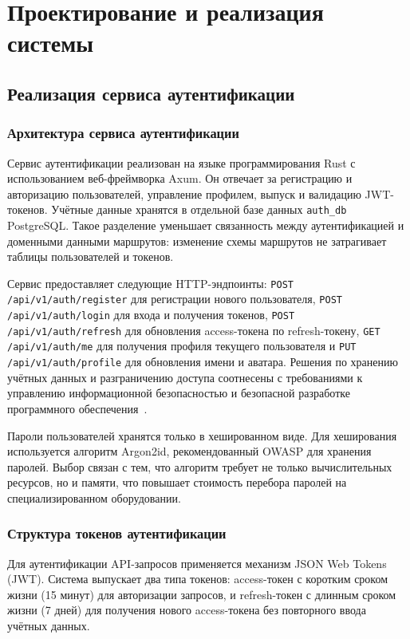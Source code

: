 \chapter{Проектирование и реализация системы}



\section{Реализация сервиса аутентификации}
\label{sec:auth-implementation}

\subsection{Архитектура сервиса аутентификации}

Сервис аутентификации реализован на языке программирования Rust с
использованием веб-фреймворка Axum. Он отвечает за регистрацию и авторизацию
пользователей, управление профилем, выпуск и валидацию JWT-токенов. Учётные
данные хранятся в отдельной базе данных \texttt{auth\_db} PostgreSQL. Такое
разделение уменьшает связанность между аутентификацией и доменными данными
маршрутов: изменение схемы маршрутов не затрагивает таблицы пользователей и
токенов.

Сервис предоставляет следующие HTTP-эндпоинты: \texttt{POST /api/v1/auth/register} для регистрации нового пользователя, \texttt{POST /api/v1/auth/login} для входа и получения токенов, \texttt{POST /api/v1/auth/refresh} для обновления access-токена по refresh-токену, \texttt{GET /api/v1/auth/me} для получения профиля текущего пользователя и \texttt{PUT /api/v1/auth/profile} для обновления имени и аватара. Решения по хранению учётных данных и разграничению доступа соотнесены с требованиями к управлению информационной безопасностью и безопасной разработке программного обеспечения~\cite{gost27001,gost56939}.

Пароли пользователей хранятся только в хешированном виде. Для хеширования
используется алгоритм Argon2id, рекомендованный OWASP для хранения паролей.
Выбор связан с тем, что алгоритм требует не только вычислительных ресурсов, но и
памяти, что повышает стоимость перебора паролей на специализированном
оборудовании.

\subsection{Структура токенов аутентификации}

Для аутентификации API-запросов применяется механизм JSON Web Tokens (JWT). Система выпускает два типа токенов: access-токен с коротким сроком жизни (15 минут) для авторизации запросов, и refresh-токен с длинным сроком жизни (7 дней) для получения нового access-токена без повторного ввода учётных данных.

